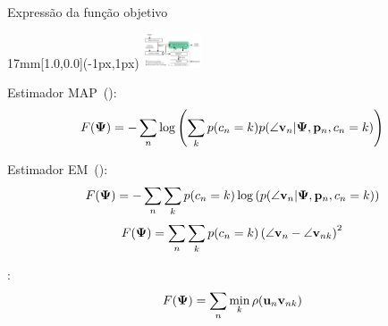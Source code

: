 \begin{frame}{Expressão da função objetivo}
  \begin{textblock*}{17mm}[1.0,0.0](\paperwidth-1px,1px)
    \includegraphics[width=17mm]{blocos_s3.png}
  \end{textblock*}

  Estimador MAP~(\cite{Coughlan2003}):
  \[
  F({\boldsymbol{\Psi}}) =
  -\sum_n\log\left(
    \sum_k  p(c_n=k)p(\angle{\mathbf{v}}_n|{\boldsymbol{\Psi}},{\mathbf{p}}_n,c_n=k)
  \right)
  \]
  
  Estimador EM~(\cite{Schindler2004}):
  \[F({\boldsymbol{\Psi}}) = -\sum_n \sum_k p(c_n=k) \log\left(
    p(\angle{\mathbf{v}}_n|{\boldsymbol{\Psi}},{\mathbf{p}}_n,c_n=k)
  \right)\]
  \[F({\boldsymbol{\Psi}}) = \sum_n \sum_k p(c_n=k) \left(\angle{\mathbf{v}}_n-\angle{\mathbf{v}}_{nk}\right)^2\]

  \corisco:
  \[
  F({\boldsymbol{\Psi}}) = \sum_n \min_k \rho({\mathbf{u}}_n {\mathbf{v}}_{nk})
  \]


\end{frame}
